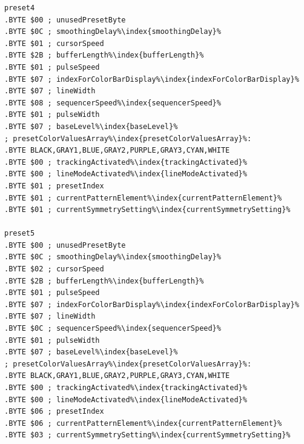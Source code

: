 \begin{minipage}[b]{0.33\linewidth}
\begin{lrbox}{\mybox}
\begin{lstlisting}[basicstyle=\ttfamily\tiny,escapechar=\%]
preset4
.BYTE $00 ; unusedPresetByte
.BYTE $0C ; smoothingDelay%\index{smoothingDelay}%
.BYTE $01 ; cursorSpeed
.BYTE $2B ; bufferLength%\index{bufferLength}%
.BYTE $01 ; pulseSpeed
.BYTE $07 ; indexForColorBarDisplay%\index{indexForColorBarDisplay}%
.BYTE $07 ; lineWidth
.BYTE $08 ; sequencerSpeed%\index{sequencerSpeed}%
.BYTE $01 ; pulseWidth
.BYTE $07 ; baseLevel%\index{baseLevel}%
; presetColorValuesArray%\index{presetColorValuesArray}%: 
.BYTE BLACK,GRAY1,BLUE,GRAY2,PURPLE,GRAY3,CYAN,WHITE
.BYTE $00 ; trackingActivated%\index{trackingActivated}%
.BYTE $00 ; lineModeActivated%\index{lineModeActivated}%
.BYTE $01 ; presetIndex
.BYTE $01 ; currentPatternElement%\index{currentPatternElement}%
.BYTE $01 ; currentSymmetrySetting%\index{currentSymmetrySetting}%

preset5
.BYTE $00 ; unusedPresetByte
.BYTE $0C ; smoothingDelay%\index{smoothingDelay}%
.BYTE $02 ; cursorSpeed
.BYTE $2B ; bufferLength%\index{bufferLength}%
.BYTE $01 ; pulseSpeed
.BYTE $07 ; indexForColorBarDisplay%\index{indexForColorBarDisplay}%
.BYTE $07 ; lineWidth
.BYTE $0C ; sequencerSpeed%\index{sequencerSpeed}%
.BYTE $01 ; pulseWidth
.BYTE $07 ; baseLevel%\index{baseLevel}%
; presetColorValuesArray%\index{presetColorValuesArray}%: 
.BYTE BLACK,GRAY1,BLUE,GRAY2,PURPLE,GRAY3,CYAN,WHITE
.BYTE $00 ; trackingActivated%\index{trackingActivated}%
.BYTE $00 ; lineModeActivated%\index{lineModeActivated}%
.BYTE $06 ; presetIndex
.BYTE $06 ; currentPatternElement%\index{currentPatternElement}%
.BYTE $03 ; currentSymmetrySetting%\index{currentSymmetrySetting}%
\end{lstlisting}
\end{lrbox}%
\scalebox{0.8}{\usebox{\mybox}}
\end{minipage}
